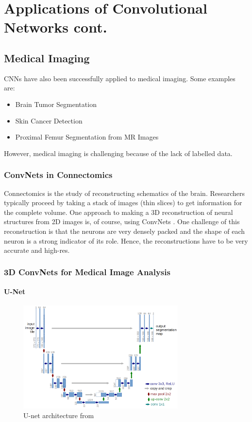 \chapter{Applications of Convolutional Networks cont.}

\section{Medical Imaging}
CNNs have also been successfully applied to medical imaging. Some examples are:
\begin{itemize}
    \item Brain Tumor Segmentation \cite{braintumor2018}
    \item Skin Cancer Detection \cite{Esteva2017DermatologistlevelCO}
    \item Proximal Femur Segmentation from MR Images \cite{Deniz2018SegmentationOT}
\end{itemize}

However, medical imaging is challenging because of the lack of labelled data.

\subsection{ConvNets in Connectomics}
Connectomics is the study of reconstructing schematics of the brain. Researchers typically proceed by taking a stack of images (thin slices) to get information for the complete volume. One approach to making a 3D reconstruction of neural structures from 2D images is, of course, using ConvNets \cite{jain2010}. One challenge of this reconstruction is that the neurons are very densely packed and the shape of each neuron is a strong indicator of its role. Hence, the reconstructions have to be very accurate and high-res.

\subsection{3D ConvNets for Medical Image Analysis}

\subsubsection{U-Net}
\begin{figure}[ht]
    \centering
    \includegraphics[width=0.75\textwidth]{figs/unet.png}
    \caption{U-net architecture from \citep{unet}}
    \label{fig:unet}
\end{figure}

